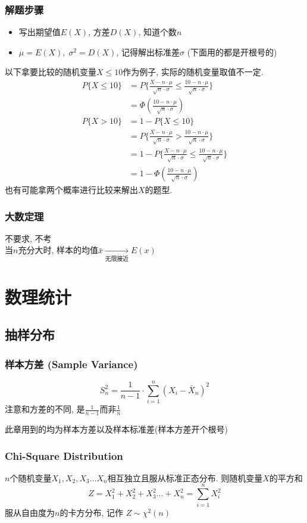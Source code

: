 \documentclass[a4paper]{report}
\begin{document}
\subsection{解题步骤}
\begin{itemize}
  \item 写出期望值$E(X)$, 方差$D(X)$, 知道个数$n$
  \item $\mu=E(X),\; \sigma^2=D(X)$, 记得解出标准差$\sigma$ (下面用的都是开根号的)
\end{itemize}
以下拿要比较的随机变量$X\leq 10$作为例子, 实际的随机变量取值不一定. 
\begin{align*}
  P \{X\leq 10\}&=P \{\frac{X-n\cdot\mu}{\sqrt{n}\cdot \sigma}\leq \frac{10-n\cdot\mu}{\sqrt{n}\cdot \sigma}\}\\
  &=\Phi(\frac{10-n\cdot\mu}{\sqrt{n}\cdot \sigma})\\
  P \{X> 10\}&=1-P \{X\leq 10\}\\
  &=P \{\frac{X-n\cdot\mu}{\sqrt{n}\cdot \sigma}> \frac{10-n\cdot\mu}{\sqrt{n}\cdot \sigma}\}\\
  &=1-P \{\frac{X-n\cdot\mu}{\sqrt{n}\cdot \sigma}\leq \frac{10-n\cdot\mu}{\sqrt{n}\cdot \sigma}\}\\
  &=1-\Phi(\frac{10-n\cdot\mu}{\sqrt{n}\cdot \sigma})
\end{align*}
也有可能拿两个概率进行比较来解出$X$的题型. 
\subsection{大数定理}
不要求, 不考\\
当$n$充分大时, 样本的均值$\bar{x}\underset{\text{无限接近}}{\rightarrow}E(x)$
\chapter{数理统计}
\section{抽样分布}
\subsection{样本方差 (Sample Variance)}
$$S^2_n=\frac{1}{n-1}\cdot \sum_{i=1}^n(X_i-\bar{X}_n)^2$$
注意和方差的不同, 是$\frac{1}{n-1}$而非$\frac{1}{n}$
\par 此章用到的均为样本方差以及样本标准差(样本方差开个根号)
\subsection{Chi-Square Distribution}
$n$个随机变量$X_1,X_2,X_3\dots X_n$相互独立且服从标准正态分布. 则随机变量$X$的平方和$$Z=X^2_1+X^2_2+X^2_3\dots +X^2_n=\sum_{i=1}^n X_i^2$$
服从自由度为$n$的卡方分布, 记作 $Z\sim \chi^2(n)$
\end{document}
